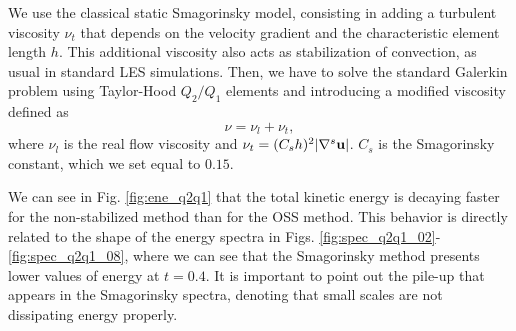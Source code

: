  We use the classical static Smagorinsky model, consisting in adding a turbulent viscosity $\nu_t$ that depends on the velocity gradient and the characteristic element length $h$. This additional viscosity also acts as stabilization of convection, as usual in standard LES simulations. Then, we have to solve the standard Galerkin problem using Taylor-Hood $Q_2/Q_1$ elements and introducing a modified viscosity defined as
 \begin{equation}
 \label{eq-C4_nu_smago}
 \nu = \nu_l+\nu_t,
 \end{equation}
 where $\nu_l$ is the real flow viscosity and $\nu_t=(C_sh)^2|\nabla^s{\bf u}|$. $C_s$ is the Smagorinsky constant, which we set equal to $0.15$.

 We can see in Fig. \ref{fig:ene_q2q1} that the total kinetic energy is decaying faster for the non-stabilized method than for the OSS method. This behavior is directly related to the shape of the energy spectra in Figs. \ref{fig:spec_q2q1_02}-\ref{fig:spec_q2q1_08}, where we can see that the Smagorinsky method presents lower values of energy at $t=0.4$. It is important to point out the pile-up that appears in the Smagorinsky spectra, denoting that small scales are not dissipating energy properly.

